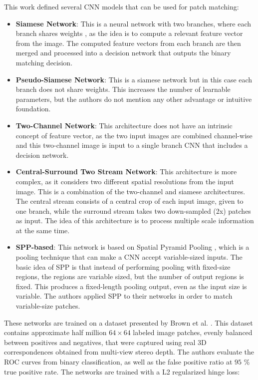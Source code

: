 This work defined several CNN models that can be used for patch matching:

\begin{itemize}
	\item \textbf{Siamese Network}: This is a neural network with two branches, where each branch shares weights \cite{bromley1994signature}, as the idea is to compute a relevant feature vector from the image. The computed feature vectors from each branch are then merged and processed into a decision network that outputs the binary matching decision.
	\item \textbf{Pseudo-Siamese Network}: This is a siamese network but in this case each branch does not share weights. This increases the number of learnable parameters, but the authors do not mention any other advantage or intuitive foundation.
	\item \textbf{Two-Channel Network}: This architecture does not have an intrinsic concept of feature vector, as the two input images are combined channel-wise and this two-channel image is input to a single branch CNN that includes a decision network.
	\item \textbf{Central-Surround Two Stream Network}: This architecture is more complex, as it considers two different spatial resolutions from the input image. This is a combination of the two-channel and siamese architectures. The central stream consists of a central crop of each input image, given to one branch, while the surround stream takes two down-sampled (2x) patches as input. The idea of this architecture is to process multiple scale information at the same time.
	\item \textbf{SPP-based}: This network is based on Spatial Pyramid Pooling \cite{he2014spatial}, which is a pooling technique that can make a CNN accept variable-sized inputs. The basic idea of SPP is that instead of performing pooling with fixed-size regions, the regions are variable sized, but the number of output regions is fixed. This produces a fixed-length pooling output, even as the input size is variable. The authors applied SPP to their networks in order to match variable-size patches.
\end{itemize}

These networks are trained on a dataset presented by Brown et al. \cite{brown2011discriminative}. This dataset contains approximate half million $64 \times 64$ labeled image patches, evenly balanced between positives and negatives, that were captured using real 3D correspondences obtained from multi-view stereo depth. The authors evaluate the ROC curves from binary classification, as well as the false positive ratio at $95$ \% true positive rate. The networks are trained with a L2 regularized hinge loss:

